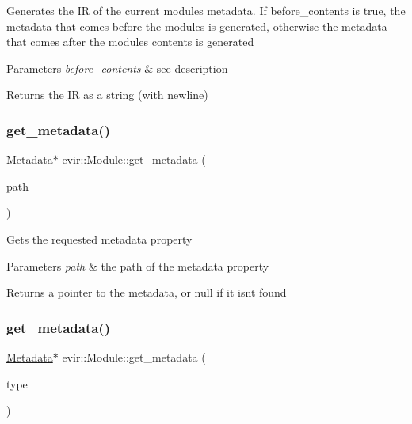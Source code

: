 Generates the IR of the current module\textquotesingle{}s metadata. If before\+\_\+contents is true, the metadata that comes before the module\textquotesingle{}s is generated, otherwise the metadata that comes after the module\textquotesingle{}s contents is generated 
\begin{DoxyParams}{Parameters}
{\em before\+\_\+contents} & see description \\
\hline
\end{DoxyParams}
\begin{DoxyReturn}{Returns}
the IR as a string (with newline) 
\end{DoxyReturn}
\mbox{\label{classevir_1_1Module_a12fd1df72d4f47cec6a5f30b17100451}} 
\subsubsection{\texorpdfstring{get\+\_\+metadata()}{get\_metadata()}\hspace{0.1cm}{\footnotesize\ttfamily [1/2]}}
{\footnotesize\ttfamily \hyperlink{classevir_1_1Metadata}{Metadata}$\ast$ evir\+::\+Module\+::get\+\_\+metadata (\begin{DoxyParamCaption}\item[{\hyperlink{classevir_1_1Metadata_a0a3a8f0c937238fae5262283bac6286a}{Metadata\+::path}}]{path }\end{DoxyParamCaption})}

Gets the requested metadata property 
\begin{DoxyParams}{Parameters}
{\em path} & the path of the metadata property \\
\hline
\end{DoxyParams}
\begin{DoxyReturn}{Returns}
a pointer to the metadata, or null if it isn\textquotesingle{}t found 
\end{DoxyReturn}
\mbox{\label{classevir_1_1Module_a37f28d71d6f1b187505539bb81501010}} 
\subsubsection{\texorpdfstring{get\+\_\+metadata()}{get\_metadata()}\hspace{0.1cm}{\footnotesize\ttfamily [2/2]}}
{\footnotesize\ttfamily \hyperlink{classevir_1_1Metadata}{Metadata}$\ast$ evir\+::\+Module\+::get\+\_\+metadata (\begin{DoxyParamCaption}\item[{\hyperlink{classevir_1_1Metadata_a292423b7a2d93f70382d1da4929f55a0}{Metadata\+::builtin\+\_\+property\+\_\+type}}]{type }\end{DoxyParamCaption})}

